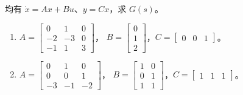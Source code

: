 \documentclass[11pt]{article}
\begin{document}
\begin{problem}[原题 7：由状态空间描述计算传递函数]
均有 $\dot x=Ax+Bu$、$y=Cx$，求 $G(s)$。
\begin{enumerate}
\item $A=\begin{bmatrix}0&1&0\\-2&-3&0\\-1&1&3\end{bmatrix}$，
$B=\begin{bmatrix}0\\1\\2\end{bmatrix}$，$C=\begin{bmatrix}0&0&1\end{bmatrix}$。
\item $A=\begin{bmatrix}0&1&0\\0&0&1\\-3&-1&-2\end{bmatrix}$，
$B=\begin{bmatrix}1&0\\0&1\\1&1\end{bmatrix}$，$C=\begin{bmatrix}1&1&1\end{bmatrix}$。
\end{enumerate}
\end{problem}
\end{document}
